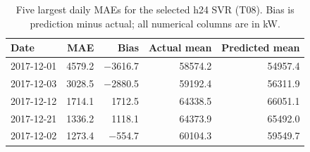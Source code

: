 \begin{table}[H]\centering\small
\caption{Five largest daily MAEs for the selected h24 SVR (T08). Bias is prediction minus actual; all numerical columns are in kW.}\label{tab:worst_days}
\setlength{\tabcolsep}{4pt}
\begin{tabular}{lrrrr}
\toprule
Date & MAE & Bias & Actual mean & Predicted mean \\
\midrule
2017-12-01 & \num{4579.2} & \num{-3616.7} & \num{58574.2} & \num{54957.4} \\
2017-12-03 & \num{3028.5} & \num{-2880.5} & \num{59192.4} & \num{56311.9} \\
2017-12-12 & \num{1714.1} & \num{1712.5} & \num{64338.5} & \num{66051.1} \\
2017-12-21 & \num{1336.2} & \num{1118.1} & \num{64373.9} & \num{65492.0} \\
2017-12-02 & \num{1273.4} & \num{-554.7} & \num{60104.3} & \num{59549.7} \\
\bottomrule\end{tabular}
\end{table}
